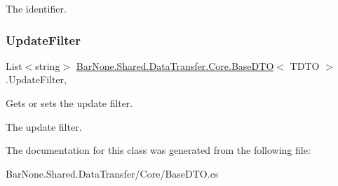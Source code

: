 The identifier. \mbox{\label{class_bar_none_1_1_shared_1_1_data_transfer_1_1_core_1_1_base_d_t_o_af827115acc551117b7f774a6e3f0675f}} 
\subsubsection{\texorpdfstring{Update\+Filter}{UpdateFilter}}
{\footnotesize\ttfamily List$<$string$>$ \mbox{\hyperlink{class_bar_none_1_1_shared_1_1_data_transfer_1_1_core_1_1_base_d_t_o}{Bar\+None.\+Shared.\+Data\+Transfer.\+Core.\+Base\+D\+TO}}$<$ T\+D\+TO $>$.Update\+Filter\hspace{0.3cm}{\ttfamily [get]}, {\ttfamily [set]}}



Gets or sets the update filter. 

The update filter. 

The documentation for this class was generated from the following file\+:\begin{DoxyCompactItemize}
\item 
Bar\+None.\+Shared.\+Data\+Transfer/\+Core/Base\+D\+T\+O.\+cs\end{DoxyCompactItemize}
